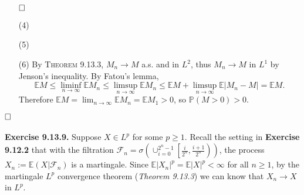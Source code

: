 \documentclass[12pt]{extarticle}
\begin{document}
\begin{enumerate}
$\hspace{\fill}\square$

\item[(4)]
\item[(5)]
\item[(6)] By \textsc{Theorem 9.13.3}, $M_n\rightarrow M$ a.s. and in $L^2$, thus $M_n\rightarrow M$ in $L^1$ by Jenson's inequality. By Fatou's lemma,
\[
\mathbb{E}M\leq\liminf_{n\rightarrow\infty}\mathbb{E}M_n\leq\limsup_{n\rightarrow\infty}\mathbb{E}M_n\leq
\mathbb{E}M+\limsup_{n\rightarrow\infty}\mathbb{E}|M_n-M|=\mathbb{E}M.
\]
Therefore $\mathbb{E}M=\lim_{n\rightarrow\infty}\mathbb{E}M_n=\mathbb{E}M_1>0$, so $\mathbb{P}(M>0)>0$.
\end{enumerate}
$\hspace{\fill}\square$
\\
\\
\textbf{Exercise 9.13.9.}
Suppose $X\in L^p$ for some $p\geq 1$.
Recall the setting in \textbf{Exercise 9.12.2} that with the filtration $
\mathcal{F}_n=\sigma\left(\cup_{i=0}^{2^n-1}\left[\frac{i}{2^n},\frac{i+1}{2^n}\right)\right)$,
the process $X_n:=\mathbb{E}(X|\mathcal{F}_n)$ is a martingale. Since $\mathbb{E}|X_n|^p=\mathbb{E}|X|^p<\infty$ for all $n\geq 1$, by the martingale $L^p$ convergence theorem (\textit{Theorem 9.13.3}) we can know that $X_n\rightarrow X$ in $L^p$.
\end{document}

